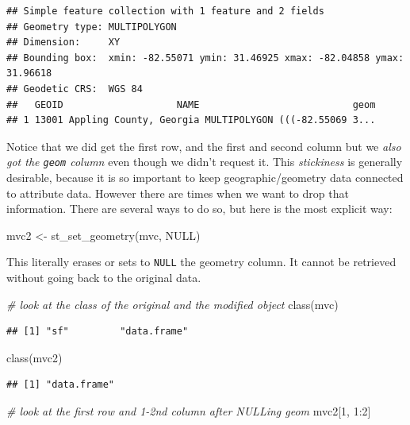\documentclass[
]{book}
\newenvironment{Shaded}{\begin{snugshade}}{\end{snugshade}}
\newcommand{\CommentTok}[1]{\textcolor[rgb]{0.56,0.35,0.01}{\textit{#1}}}
\newcommand{\ConstantTok}[1]{\textcolor[rgb]{0.00,0.00,0.00}{#1}}
\newcommand{\DecValTok}[1]{\textcolor[rgb]{0.00,0.00,0.81}{#1}}
\newcommand{\FunctionTok}[1]{\textcolor[rgb]{0.00,0.00,0.00}{#1}}
\newcommand{\NormalTok}[1]{#1}
\newcommand{\OtherTok}[1]{\textcolor[rgb]{0.56,0.35,0.01}{#1}}
\newcommand{\SpecialCharTok}[1]{\textcolor[rgb]{0.00,0.00,0.00}{#1}}
\begin{document}
\begin{verbatim}
## Simple feature collection with 1 feature and 2 fields
## Geometry type: MULTIPOLYGON
## Dimension:     XY
## Bounding box:  xmin: -82.55071 ymin: 31.46925 xmax: -82.04858 ymax: 31.96618
## Geodetic CRS:  WGS 84
##   GEOID                    NAME                           geom
## 1 13001 Appling County, Georgia MULTIPOLYGON (((-82.55069 3...
\end{verbatim}

Notice that we did get the first row, and the first and second column but we \emph{also got the \texttt{geom} column} even though we didn't request it. This \emph{stickiness} is generally desirable, because it is so important to keep geographic/geometry data connected to attribute data. However there are times when we want to drop that information. There are several ways to do so, but here is the most explicit way:

\begin{Shaded}
\begin{Highlighting}[]
\NormalTok{mvc2 }\OtherTok{\textless{}{-}} \FunctionTok{st\_set\_geometry}\NormalTok{(mvc, }\ConstantTok{NULL}\NormalTok{)}
\end{Highlighting}
\end{Shaded}

This literally erases or sets to \texttt{NULL} the geometry column. It cannot be retrieved without going back to the original data.

\begin{Shaded}
\begin{Highlighting}[]
\CommentTok{\# look at the class of the original and the modified object}
\FunctionTok{class}\NormalTok{(mvc)}
\end{Highlighting}
\end{Shaded}

\begin{verbatim}
## [1] "sf"         "data.frame"
\end{verbatim}

\begin{Shaded}
\begin{Highlighting}[]
\FunctionTok{class}\NormalTok{(mvc2)}
\end{Highlighting}
\end{Shaded}

\begin{verbatim}
## [1] "data.frame"
\end{verbatim}

\begin{Shaded}
\begin{Highlighting}[]
\CommentTok{\# look at the first row and 1{-}2nd column after NULLing geom}
\NormalTok{mvc2[}\DecValTok{1}\NormalTok{, }\DecValTok{1}\SpecialCharTok{:}\DecValTok{2}\NormalTok{]}
\end{Highlighting}
\end{Shaded}
\end{document}
